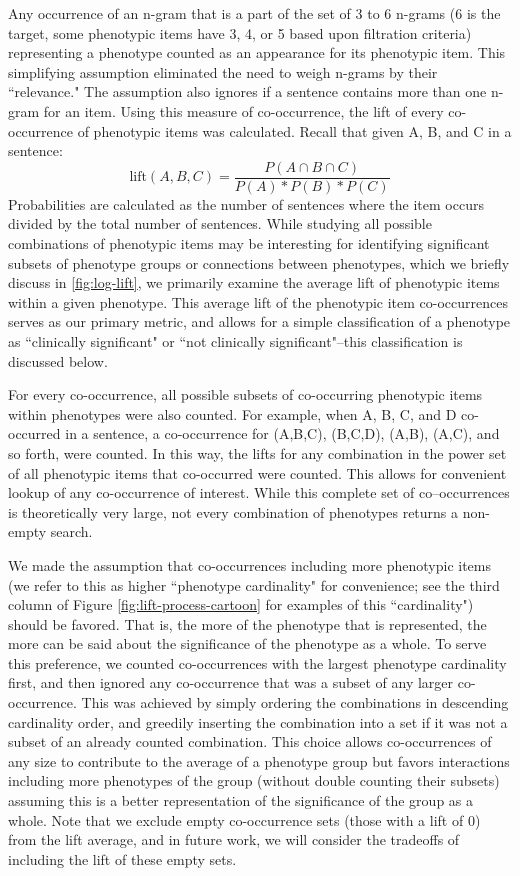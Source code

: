 \documentclass{sig-alternate-05-2015}
\begin{document}
Any occurrence of an n-gram that is a part of the set of 3 to 6 n-grams (6 is the target, some phenotypic items have 3, 4, or 5 based upon filtration criteria) representing a phenotype counted as an appearance for its phenotypic item.
This simplifying assumption eliminated the need to weigh n-grams by their ``relevance."	
The assumption also ignores if a sentence contains more than one n-gram for an item.
Using this measure of co-occurrence, the lift of every co-occurrence of phenotypic items was calculated. Recall that given A, B, and C in a sentence:
$$ \text{lift}(A,B,C) = \frac {P(A \cap B \cap C)} {P(A)*P(B)*P(C)}  $$
Probabilities are calculated as the number of sentences where the item occurs divided by the total number of sentences.
While studying all possible combinations of phenotypic items may be interesting for identifying significant subsets of phenotype groups or connections between phenotypes, which we briefly discuss in \ref{fig:log-lift}, we primarily examine the average lift of phenotypic items within a given phenotype. This average lift of the phenotypic item co-occurrences serves as our primary metric, and allows for a simple classification of a phenotype as ``clinically significant" or ``not clinically significant"--this classification is discussed below.%

For every co-occurrence, all possible subsets of co-occurring phenotypic items within phenotypes were also counted.
For example, when A, B, C, and D co-occurred in a sentence, a co-occurrence for (A,B,C), (B,C,D), (A,B), (A,C), and so forth, were counted.
In this way, the lifts for any combination in the power set of all phenotypic items that co-occurred were counted.
This allows for convenient lookup of any co-occurrence of interest.
While this complete set of co--occurrences is theoretically very large, not every combination of phenotypes returns a non-empty search.

We made the assumption that co-occurrences including more phenotypic items (we refer to this as higher ``phenotype cardinality" for convenience; see the third column of Figure \ref{fig:lift-process-cartoon} for examples of this ``cardinality") should be favored. That is, the more of the phenotype that is represented, the more can be said about the significance of the phenotype as a whole. 
To serve this preference, we counted co-occurrences with the largest phenotype cardinality first, and then ignored any co-occurrence that was a subset of any larger co-occurrence. This was achieved by simply ordering the combinations in descending cardinality order, and greedily inserting the combination into a set if it was not a subset of an already counted combination. 
This choice allows co-occurrences of any size to contribute to the average of a phenotype group but favors interactions including more phenotypes of the group (without double counting their subsets) assuming this is a better representation of the significance of the group as a whole. Note that we exclude empty co-occurrence sets (those with a lift of 0) from the lift average, and in future work, we will consider the tradeoffs of including the lift of these empty sets.
\end{document}
